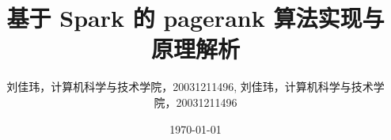\title{基于 Spark 的 pagerank 算法实现与原理解析}
\date{\today}
\author{刘佳玮，计算机科学与技术学院，20031211496, 刘佳玮，计算机科学与技术学院，20031211496}

